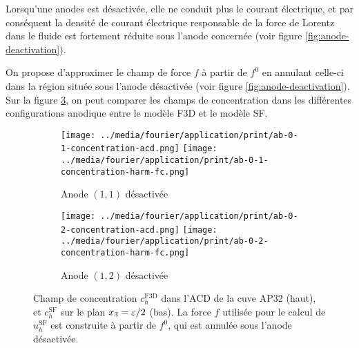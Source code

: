 Lorsqu'une anodes est désactivée, elle ne conduit plus le courant
électrique, et par conséquent la densité de courant électrique
responsable de la force de Lorentz dans le fluide est fortement
réduite sous l'anode concernée (voir figure \ref{fig:anode-deactivation}).

On propose d'approximer le champ de force $f$ à partir de $f^0$ en
annulant celle-ci dans la région située sous l'anode désactivée (voir
figure \ref{fig:anode-deactivation}). Sur la figure
\ref{fig:harmonic-concentration-comp-fc}, on peut comparer les champs
de concentration dans les différentes configurations anodique entre le
modèle F3D et le modèle SF.


\begin{figure}[h]
\begin{center}
\begin{subfigure}[t]{\textwidth}
  \texttt{[image: ../media/fourier/application/print/ab-0-1-concentration-acd.png]}
  \texttt{[image: ../media/fourier/application/print/ab-0-1-concentration-harm-fc.png]}
  \caption{Anode $(1,1)$ désactivée}
  \label{}
\end{subfigure}

\begin{subfigure}[t]{\textwidth}
  \texttt{[image: ../media/fourier/application/print/ab-0-2-concentration-acd.png]}
  \texttt{[image: ../media/fourier/application/print/ab-0-2-concentration-harm-fc.png]}
  \caption{Anode $(1,2)$ désactivée}
  \label{}
\end{subfigure}


        \caption{Champ de concentration $c_h^\mathrm{F3D}$ dans l'ACD de
      la cuve AP32 (haut), et $c_h^\mathrm{SF}$ sur le plan
      $x_3 = \varepsilon / 2$ (bas). La force $f$ utilisée
      pour le calcul de $u_h^\mathrm{SF}$  est construite à
      partir de $f^0$, qui est annulée sous l'anode désactivée.}
\label{fig:harmonic-concentration-comp-fc}
\end{center}
\end{figure}

